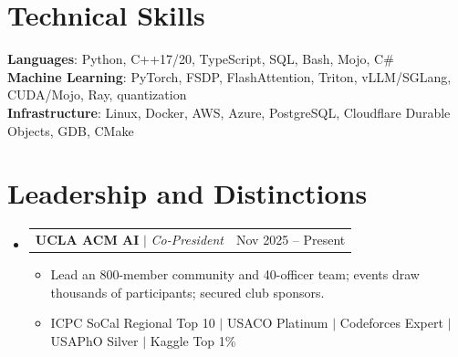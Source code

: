 \documentclass[letterpaper,11pt]{article}
\makeatletter
\newcommand{\resumeItem}[1]{\item\small{{#1 \vspace{-2pt}}}}
\newcommand{\resumeProjectHeading}[2]{
  \item
  \begin{tabular*}{0.97\textwidth}{l@{\extracolsep{\fill}}r}
    \small#1 & #2 \\
  \end{tabular*}\vspace{-7pt}
}
\newcommand{\resumeSubHeadingListStart}{\begin{itemize}[leftmargin=0.05in, label={}]}
\newcommand{\resumeSubHeadingListEnd}{\end{itemize}\vspace{-10pt}}
\newcommand{\resumeItemListStart}{\begin{itemize}[leftmargin=0.16in]}
\newcommand{\resumeItemListEnd}{\end{itemize}\vspace{-6pt}}
\makeatother
\begin{document}
\section{Technical Skills}
 \begin{itemize}[leftmargin=0.15in, label={}]
    \small{\item{
     \textbf{Languages}{: Python, C++17/20, TypeScript, SQL, Bash, Mojo, C\#} \\
     \textbf{Machine Learning}{: PyTorch, FSDP, FlashAttention, Triton, vLLM/SGLang, CUDA/Mojo, Ray, quantization} \\
     \textbf{Infrastructure}{: Linux, Docker, AWS, Azure, PostgreSQL, Cloudflare Durable Objects, GDB, CMake}
    }}
 \end{itemize}

\section{Leadership and Distinctions}
  \resumeSubHeadingListStart
    \resumeProjectHeading
      {\textbf{UCLA ACM AI} $|$ \emph{Co-President}}{Nov 2025 -- Present}
      \resumeItemListStart
        \resumeItem{Lead an 800-member community and 40-o\mbox{f}\mbox{f}icer team; events draw thousands of participants; secured club sponsors.}
        \resumeItem{ICPC SoCal Regional Top 10 $|$ USACO Platinum $|$ Codeforces Expert $|$ USAPhO Silver $|$ Kaggle Top 1\%}
      \resumeItemListEnd
  \resumeSubHeadingListEnd
\end{document}
